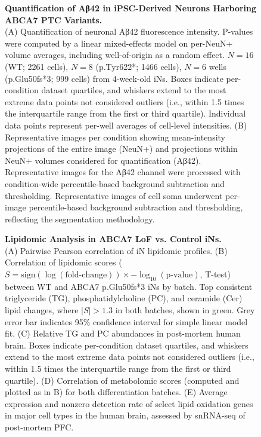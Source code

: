 \begin{figure}[ht]
    \caption{
        \textbf{Quantification of Aβ42 in iPSC-Derived Neurons Harboring ABCA7 PTC Variants.}\\[1ex]
        (A) Quantification of neuronal Aβ42 fluorescence intensity. P-values were computed by a linear mixed-effects model on per-NeuN+ volume averages, including well-of-origin as a random effect. $N = 16$ (WT; 2261 cells), $N=8$ (p.Tyr622*; 1466 cells), $N=6$ wells (p.Glu50fs*3; 999 cells) from 4-week-old iNs. Boxes indicate per-condition dataset quartiles, and whiskers extend to the most extreme data points not considered outliers (i.e., within 1.5 times the interquartile range from the first or third quartile). Individual data points represent per-well averages of cell-level intensities. 
        (B) Representative images per condition showing mean-intensity projections of the entire image (NeuN+) and projections within NeuN+ volumes considered for quantification (Aβ42). Representative images for the Aβ42 channel were processed with condition-wide percentile-based background subtraction and thresholding. Representative images of cell soma underwent per-image percentile-based background subtraction and thresholding, reflecting the segmentation methodology.
    }
    \label{fig:quantification_Abeta42_iPSC_neurons}
\end{figure}

\begin{figure}[ht]
    \caption{
        \textbf{Lipidomic Analysis in ABCA7 LoF vs. Control iNs.}\\[1ex]
        (A) Pairwise Pearson correlation of iN lipidomic profiles. 
        (B) Correlation of lipidomic scores ($S = \text{sign}(\log(\text{fold-change})) \times -\log_{10}(\text{p-value})$, T-test) between WT and ABCA7 p.Glu50fs*3 iNs by batch. Top consistent triglyceride (TG), phosphatidylcholine (PC), and ceramide (Cer) lipid changes, where $|S| > 1.3$ in both batches, shown in green. Grey error bar indicates 95\% confidence interval for simple linear model fit. 
        (C) Relative TG and PC abundances in post-mortem human brain. Boxes indicate per-condition dataset quartiles, and whiskers extend to the most extreme data points not considered outliers (i.e., within 1.5 times the interquartile range from the first or third quartile). 
        (D) Correlation of metabolomic scores (computed and plotted as in B) for both differentiation batches. 
        (E) Average expression and nonzero detection rate of select lipid oxidation genes in major cell types in the human brain, assessed by snRNA-seq of post-mortem PFC.
    }
    \label{fig:lipidomic_analysis_iPSC_neurons}
\end{figure}

